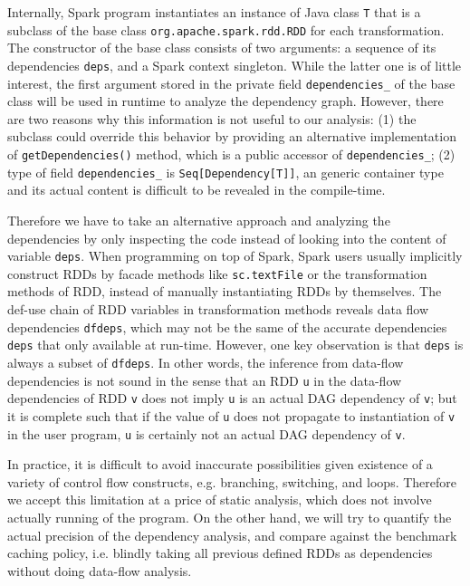 \documentclass[conference]{sig-alternate-05-2015}
\begin{document}
Internally, Spark program instantiates an instance of Java class \texttt{T} that is a subclass of the base class \texttt{org.apache.spark.rdd.RDD} for each transformation. The constructor of the base class consists of two arguments: a sequence of its dependencies \texttt{deps}, and a Spark context singleton. While the latter one is of little interest, the first argument stored in the private field \texttt{dependencies\_} of the base class will be used in runtime to analyze the dependency graph. However, there are two reasons why this information is not useful to our analysis: (1) the subclass could override this behavior by providing an alternative implementation of \texttt{getDependencies()} method, which is a public accessor of \texttt{dependencies\_}; (2) type of field \texttt{dependencies\_} is \texttt{Seq[Dependency[T]]}, an generic container type and its actual content is difficult to be revealed in the compile-time.

Therefore we have to take an alternative approach and analyzing the dependencies by only inspecting the code instead of looking into the content of variable \texttt{deps}. When programming on top of Spark, Spark users usually implicitly construct RDDs by facade methods like \texttt{sc.textFile} or the transformation methods of RDD, instead of manually instantiating RDDs by themselves. The def-use chain of RDD variables in transformation methods reveals data flow dependencies \texttt{dfdeps}, which may not be the same of the accurate dependencies \texttt{deps} that only available at run-time. However, one key observation is that \texttt{deps} is always a subset of \texttt{dfdeps}. In other words, the inference from data-flow dependencies is not sound in the sense that an RDD \texttt{u} in the data-flow dependencies of RDD \texttt{v} does not imply \texttt{u} is an actual DAG dependency of \texttt{v}; but it is complete such that if the value of \texttt{u} does not propagate to instantiation of \texttt{v} in the user program, \texttt{u} is certainly not an actual DAG dependency of \texttt{v}.

In practice, it is difficult to avoid inaccurate possibilities given existence of a variety of control flow constructs, e.g. branching, switching, and loops. Therefore we accept this limitation at a price of static analysis, which does not involve actually running of the program. On the other hand, we will try to quantify the actual precision of the dependency analysis, and compare against the benchmark caching policy, i.e. blindly taking all previous defined RDDs as dependencies without doing data-flow analysis.
\end{document}
